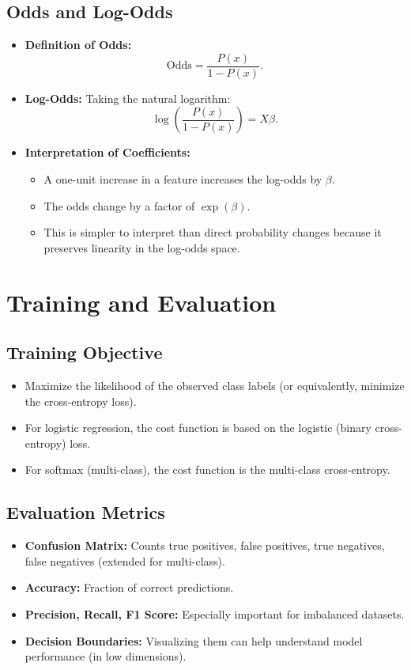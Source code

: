 \documentclass[10pt]{article}
\begin{document}
\subsection{Odds and Log-Odds}
\begin{itemize}
    \item \textbf{Definition of Odds:} 
    \[
    \text{Odds} = \frac{P(x)}{1-P(x)}.
    \]
    \item \textbf{Log-Odds:} Taking the natural logarithm:
    \[
    \log\left(\frac{P(x)}{1-P(x)}\right) = X\beta.
    \]
    \item \textbf{Interpretation of Coefficients:}
    \begin{itemize}
        \item A one-unit increase in a feature increases the log-odds by \(\beta\).
        \item The odds change by a factor of \(\exp(\beta)\).
        \item This is simpler to interpret than direct probability changes because it preserves linearity in the log-odds space.
    \end{itemize}
\end{itemize}

\section{Training and Evaluation}

\subsection{Training Objective}
\begin{itemize}
    \item Maximize the likelihood of the observed class labels (or equivalently, minimize the cross-entropy loss).
    \item For logistic regression, the cost function is based on the logistic (binary cross-entropy) loss.
    \item For softmax (multi-class), the cost function is the multi-class cross-entropy.
\end{itemize}

\subsection{Evaluation Metrics}
\begin{itemize}
    \item \textbf{Confusion Matrix:} Counts true positives, false positives, true negatives, false negatives (extended for multi-class).
    \item \textbf{Accuracy:} Fraction of correct predictions.
    \item \textbf{Precision, Recall, F1 Score:} Especially important for imbalanced datasets.
    \item \textbf{Decision Boundaries:} Visualizing them can help understand model performance (in low dimensions).
\end{itemize}
\end{document}
